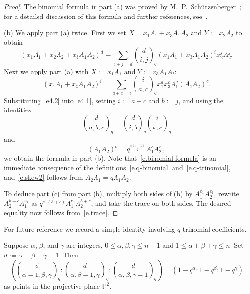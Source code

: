 \documentclass[12pt]{amsart}
\numberwithin{equation}{section}
\numberwithin{subsection}{section}
\theoremstyle{definition} \newtheorem{definition}[theorem]{Definition}
\newcommand{\bbP}{\mathbb{P}}
\begin{document}
\begin{proof} The binomial formula in part (a) was proved by
M.~P.~Sch\"utzenberger~\cite{schutzenberger}; for a 
detailed discussion of this formula and further references, 
see~\cite{monthly}.

(b) We apply part (a) twice. First we set 
$X = x_1 A_1 + x_3 A_1 A_2$ and $Y := x_2 A_2$ to obtain  
\begin{equation} \label{e4.1} (x_1 A_1 + x_2 A_2 + x_3 A_1 A_2)^d = 
\sum_{i + j = d}
\binom{d}{i, j}_q
(x_1 A_1 + x_3 A_1 A_2)^i x_2^{j} A_2^{j}.
\end{equation}
Next we apply part (a) with $X := x_1A_1$ and $Y := x_3 A_1 A_2$:
\begin{equation} \label{e4.2} (x_1 A_1 + x_3 A_1 A_2)^i = 
\sum_{ a + c = i} 
\binom{i}{a, c}_q 
x_1^a x_3^{c} A_1^a (A_1 A_2)^c . 
\end{equation} 
Substituting~\eqref{e4.2} into \eqref{e4.1}, setting $i := a + c$ and $b:= j$, 
and using the identities
\begin{equation} \label{e.binomial-formula}
\binom{d}{a, b, c}_q =  \binom{d}{i, b}_q 
\binom{i}{a, c}_q 
\end{equation}
and  
\begin{equation} \label{e.skew2}
(A_1 A_2)^c = q^{\frac{c(c-1)}{2}} A_1^c A_2^c \, , 
\end{equation}
we obtain the formula in part (b). Note that~\eqref{e.binomial-formula}
is an immediate consequence of 
the definitions~\eqref{e.q-binomial} and~\eqref{e.q-trinomial}, 
and~\eqref{e.skew2} follows from $A_2A_1 = q A_1 A_2$.

To deduce part (c) from part (b), multiply both sides of (b) 
by $A_1^{e_1} A_2^{e_2}$, rewrite 
$A_2^{b + c} A_1^{e_1}$ as $q^{e_1(b + c)} A_1^{e_1} A_2^{b + c}$,
and take the trace on both sides. The desired equality now follows 
from~\eqref{e.trace}.
\end{proof}

For future reference we record a simple identity involving $q$-trinomial 
coefficients.

\begin{lemma} \label{lem.ratios}
Suppose $\alpha$, $\beta$, and $\gamma$ are integers,
$0 \leqslant \alpha, \beta, \gamma \leqslant n-1$ and 
$1 \leqslant \alpha + \beta + \gamma \leqslant n$. 
Set $d := \alpha + \beta + \gamma - 1$. Then  
\[ (\binom{d}{\alpha-1, \beta, \gamma}_q : 
 \binom{d}{\alpha, \beta -1 , \gamma}_q : 
 \binom{d}{\alpha, \beta, \gamma -1}_q ) =
(1 - q^{\alpha}: 1 - q^{\beta}: 1 - q^{\gamma}) \] 
as points in the projective plane $\bbP^2$.
\end{lemma}
\end{document}
